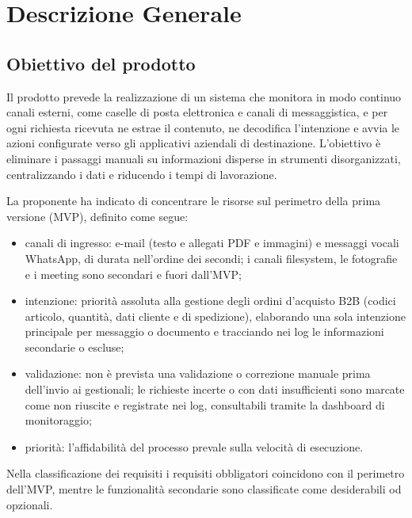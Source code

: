 \section{Descrizione Generale}
\label{sec:descrizione}

\subsection{Obiettivo del prodotto}
Il prodotto prevede la realizzazione di un sistema che monitora in modo continuo canali esterni, come caselle di posta elettronica e canali di messaggistica, e per ogni richiesta ricevuta ne estrae il contenuto, ne decodifica l'intenzione e avvia le azioni configurate verso gli applicativi aziendali di destinazione. L'obiettivo è eliminare i passaggi manuali su informazioni disperse in strumenti disorganizzati, centralizzando i dati e riducendo i tempi di lavorazione.

La proponente ha indicato di concentrare le risorse sul perimetro della prima versione (MVP), definito come segue:
	\begin{itemize}
		\item canali di ingresso: e-mail (testo e allegati PDF e immagini) e messaggi vocali WhatsApp, di durata nell'ordine dei secondi; i canali filesystem, le fotografie e i meeting sono secondari e fuori dall'MVP;
		\item intenzione: priorità assoluta alla gestione degli ordini d'acquisto B2B (codici articolo, quantità, dati cliente e di spedizione), elaborando una sola intenzione principale per messaggio o documento e tracciando nei log le informazioni secondarie o escluse;
		\item validazione: non è prevista una validazione o correzione manuale prima dell'invio ai gestionali; le richieste incerte o con dati insufficienti sono marcate come non riuscite e registrate nei log, consultabili tramite la dashboard di monitoraggio;
		\item priorità: l'affidabilità del processo prevale sulla velocità di esecuzione.
	\end{itemize}
Nella classificazione dei requisiti i requisiti obbligatori coincidono con il perimetro dell'MVP, mentre le funzionalità secondarie sono classificate come desiderabili od opzionali.

